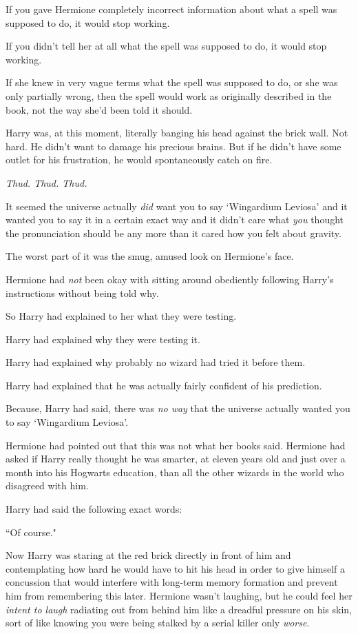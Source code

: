 If you gave Hermione completely incorrect information about what a spell was supposed to do, it would stop working.

If you didn't tell her at all what the spell was supposed to do, it would stop working.

If she knew in very vague terms what the spell was supposed to do, or she was only partially wrong, then the spell would work as originally described in the book, not the way she'd been told it should.

Harry was, at this moment, literally banging his head against the brick wall. Not hard. He didn't want to damage his precious brains. But if he didn't have some outlet for his frustration, he would spontaneously catch on fire.

\emph{Thud. Thud. Thud.}

It seemed the universe actually \emph{did} want you to say `Wingardium Leviosa' and it wanted you to say it in a certain exact way and it didn't care what \emph{you} thought the pronunciation should be any more than it cared how you felt about gravity.

\emph{}

The worst part of it was the smug, amused look on Hermione's face.

Hermione had \emph{not} been okay with sitting around obediently following Harry's instructions without being told why.

So Harry had explained to her what they were testing.

Harry had explained why they were testing it.

Harry had explained why probably no wizard had tried it before them.

Harry had explained that he was actually fairly confident of his prediction.

Because, Harry had said, there was \emph{no way} that the universe actually wanted you to say `Wingardium Leviosa'.

Hermione had pointed out that this was not what her books said. Hermione had asked if Harry really thought he was smarter, at eleven years old and just over a month into his Hogwarts education, than all the other wizards in the world who disagreed with him.

Harry had said the following exact words:

``Of course."

Now Harry was staring at the red brick directly in front of him and contemplating how hard he would have to hit his head in order to give himself a concussion that would interfere with long-term memory formation and prevent him from remembering this later. Hermione wasn't laughing, but he could feel her \emph{intent to laugh} radiating out from behind him like a dreadful pressure on his skin, sort of like knowing you were being stalked by a serial killer only \emph{worse}.

